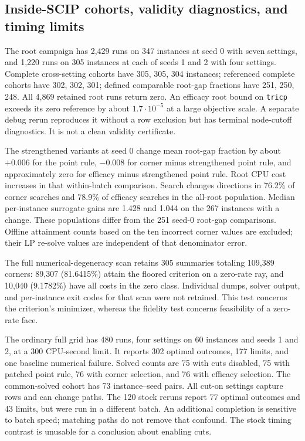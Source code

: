 \subsection{Inside-SCIP cohorts, validity diagnostics, and timing limits}
\label{exp:debug}

The root campaign has 2,429 runs on 347 instances at seed 0 with seven
settings, and 1,220 runs on 305 instances at each of seeds 1 and 2 with
four settings. Complete cross-setting cohorts have 305, 305, 304 instances;
referenced complete cohorts have 302, 302, 301; defined comparable
root-gap fractions have 251, 250, 248. All 4,869 retained root runs return
zero. An efficacy root bound on \texttt{tricp} exceeds its zero reference
by about $1.7\cdot 10^{-5}$ at a large objective scale. A separate debug
rerun reproduces it without a row exclusion but has terminal node-cutoff
diagnostics. It is not a clean validity certificate.

The strengthened variants at seed 0 change mean root-gap fraction by
about $+0.006$ for the point rule, $-0.008$ for corner minus strengthened
point rule, and approximately zero for efficacy minus strengthened point
rule. Root CPU cost increases in that within-batch comparison. Search
changes directions in 76.2\% of corner searches and 78.9\% of efficacy
searches in the all-root population. Median per-instance surrogate gains
are 1.428 and 1.044 on the 267 instances with a change. These populations
differ from the 251 seed-0 root-gap comparisons. Offline attainment
counts based on the ten incorrect corner values are excluded; their
LP re-solve values are independent of that denominator error.

The full numerical-degeneracy scan retains 305 summaries totaling
109,389 corners: 89,307 (81.6415\%) attain the floored criterion on a
zero-rate ray, and 10,040 (9.1782\%) have all costs in the zero class.
Individual dumps, solver output, and per-instance exit codes for that
scan were not retained. This test concerns the criterion's minimizer,
whereas the fidelity test concerns feasibility of a zero-rate face.

The ordinary full grid has 480 runs, four settings on 60 instances and
seeds 1 and 2, at a 300 CPU-second limit. It reports 302 optimal outcomes,
177 limits, and one baseline numerical failure. Solved counts are 75
with cuts disabled, 75 with patched point rule, 76 with corner selection,
and 76 with efficacy selection. The common-solved cohort has 73
instance--seed pairs. All cut-on settings capture rows and can change
paths. The 120 stock reruns report 77 optimal outcomes and 43 limits,
but were run in a different batch. An additional completion is sensitive
to batch speed; matching paths do not remove that confound. The stock
timing contrast is unusable for a conclusion about enabling cuts.

